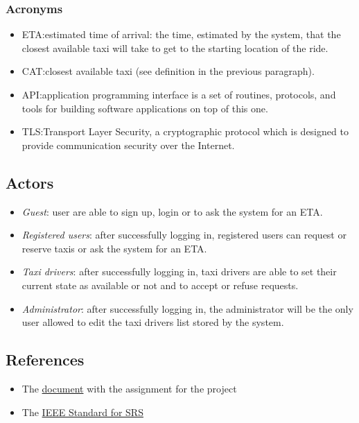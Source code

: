 \documentclass{article}
\begin{document}
\subsubsection{Acronyms}
\begin{itemize}
	\item ETA:\@ estimated time of arrival: the time, estimated by the system, that the closest available taxi will take to get to the starting location of the ride.
	\item CAT:\@ closest available taxi (see definition in the previous paragraph).
	\item API:\@ application programming interface is a set of routines, protocols, and tools for building software applications on top of this one.
	\item TLS:\@ Transport Layer Security, a cryptographic protocol which is designed to provide communication security over the Internet. %
\end{itemize}
\subsection{Actors}
\begin{itemize}
	\item \textit{Guest}: user are able to sign up, login or to ask the system for an ETA.\@
	\item \textit{Registered users}: after successfully logging in, registered users can request or reserve taxis or ask the system for an ETA.
	\item \textit{Taxi drivers}: after successfully logging in, taxi drivers are able to set their current state as available or not and to accept or refuse requests.
	\item \textit{Administrator}: after successfully logging in, the administrator will be the only user allowed to edit the taxi drivers list stored by the system.
\end{itemize}

\subsection{References}
\begin{itemize}
	\item The \href{run:./external_references/assignments.pdf}{document} with the assignment for the project
	\item The \href{run:./external_references/assignments.pdf}{IEEE Standard for SRS } 
\end{itemize}
\end{document}
